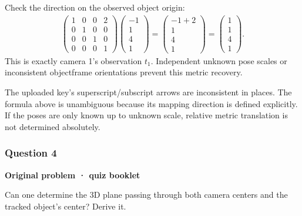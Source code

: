\documentclass[letterpaper,11pt,english,openany,oneside]{jupyterBook}
\begin{document}
\sphinxAtStartPar
Check the direction on the observed object origin:
{\color{QuizMathBlue} \begin{equation*}
\begin{split}
\begin{pmatrix}1&0&0&2\\0&1&0&0\\0&0&1&0\\0&0&0&1\end{pmatrix}
\begin{pmatrix}-1\\1\\4\\1\end{pmatrix}
=\begin{pmatrix}-1+2\\1\\4\\1\end{pmatrix}
=\begin{pmatrix}1\\1\\4\\1\end{pmatrix}.
\end{split}
\end{equation*}}
\sphinxAtStartPar
This is exactly camera 1’s observation {\color{QuizMathBlue} \(t_1\)}. Independent unknown pose scales or inconsistent object\sphinxhyphen{}frame orientations prevent this metric recovery.

\par

\sphinxAtStartPar
{} The uploaded key’s superscript/subscript arrows are inconsistent in places. The formula above is unambiguous because its mapping direction is defined explicitly. If the poses are only known up to unknown scale, relative metric translation is not determined absolutely.


\subsubsection{Question 4}
\label{\detokenize{lectures/lecture01/quiz-workbook:question-4}}\label{\detokenize{lectures/lecture01/quiz-workbook:quiz-17-q4}}\label{\detokenize{lectures/lecture01/quiz-workbook:ex-lec01-object-plane}}
\par\medskip\textbf{Original problem · quiz booklet}\par\smallskip

\sphinxAtStartPar
Can one determine the 3D plane passing through both camera centers and the tracked object’s center? Derive it.
\end{document}

